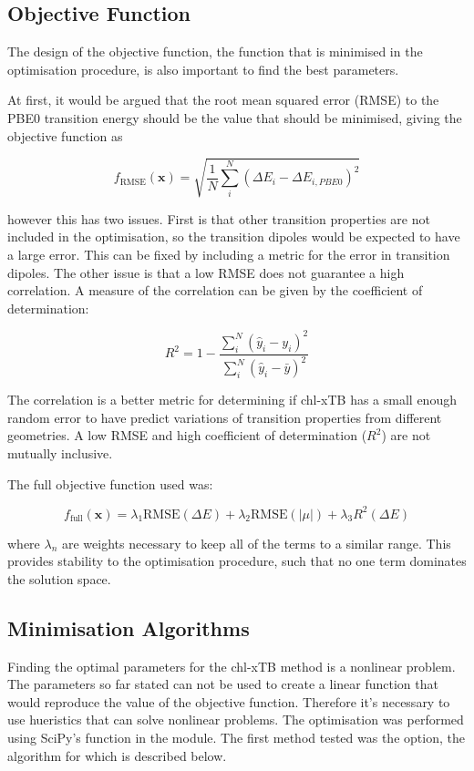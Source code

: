 \subsection{Objective Function}
\label{subsec:obj_func}
The design of the objective function, the function that is minimised in the optimisation
procedure, is also important to find the best parameters.

At first, it would be argued that the root mean squared error (RMSE) to the PBE0 
transition energy should be the value that should be minimised, giving the objective
function as

\begin{equation}
f_{\text{RMSE}}\left(\mathbf{x}\right) = \sqrt{ \frac{1}{N} \sum^N_i \left( \Delta E_i  - \Delta E_{i, PBE0}\right)^2}
\end{equation}

however this has two issues. First is that other transition properties are not 
included in the optimisation, so the transition dipoles would be expected to have 
a large error. This can be fixed by including a metric for the error in transition dipoles.
The other issue is that a low RMSE does not guarantee a high correlation. A measure
of the correlation can be given by the coefficient of determination:

\begin{equation}
R^2 = 1 - \frac{\sum^N_i \left(\hat{y}_i - y_i \right)^2}{\sum^N_i \left(\hat{y}_i - \bar{y}\right)^2}
\end{equation}

The correlation is a better metric for determining if chl-xTB has a small enough random
error to have predict variations of transition properties from different geometries.
A low RMSE and high coefficient of determination ($R^2$) are not mutually inclusive.

The full objective function used was:

\begin{equation}
f_{\text{full}} \left( \mathbf{x} \right) = \lambda_1 \text{RMSE} \left(\Delta E \right)+ \lambda_2 \text{RMSE}\left( \left| \mu \right| \right) + \lambda_3 R^2 \left( \Delta E \right)
\end{equation}

where $\lambda_n$ are weights necessary to keep all of the terms to a similar range.
This provides stability to the optimisation procedure, such that no one term dominates
the solution space.

\subsection{Minimisation Algorithms}
\label{subsec:algorithms}
Finding the optimal parameters for the chl-xTB method is a nonlinear problem. The
parameters so far stated can not be used to create a linear function that would
reproduce the value of the objective function. Therefore it's necessary to use
hueristics that can solve nonlinear problems. 
The optimisation was performed using SciPy's  function in the 
 module. The first method tested was the  option,
the algorithm for which is described below.

